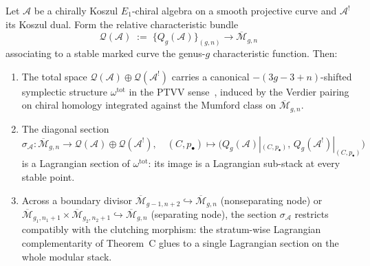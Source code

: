 \begin{theorem}
\label{thm:theoremC-total-shifted-symplectic}
Let $\mathcal{A}$ be a chirally Koszul $E_1$-chiral algebra on a
smooth projective curve and $\mathcal{A}^!$ its Koszul dual. Form
the relative characteristic bundle
\[
 \mathcal{Q}(\mathcal{A}) \;:=\;
 \bigl\{Q_g(\mathcal{A})\bigr\}_{(g,n)} \longrightarrow
 \overline{\mathcal{M}}_{g,n}
\]
associating to a stable marked curve the genus-$g$ characteristic
function. Then:
\begin{enumerate}
\item\label{tsc-i} The total space
 $\mathcal{Q}(\mathcal{A}) \oplus \mathcal{Q}(\mathcal{A}^!)$
 carries a canonical $-(3g{-}3{+}n)$-shifted symplectic structure
 $\omega^{\mathrm{tot}}$ in the PTVV
 sense~\cite{PTVV13}, induced by the Verdier pairing on chiral
 homology integrated against the Mumford class on
 $\overline{\mathcal{M}}_{g,n}$.
\item\label{tsc-ii} The diagonal section
 $\sigma_{\mathcal{A}}\colon
 \overline{\mathcal{M}}_{g,n} \longrightarrow
 \mathcal{Q}(\mathcal{A}) \oplus \mathcal{Q}(\mathcal{A}^!),
 \quad
 (C, p_\bullet) \mapsto
 \bigl(Q_g(\mathcal{A})|_{(C,p_\bullet)},\,
 Q_g(\mathcal{A}^!)|_{(C,p_\bullet)}\bigr)$
 is a Lagrangian section of $\omega^{\mathrm{tot}}$: its image is a
 Lagrangian sub-stack at every stable point.
\item\label{tsc-iii} Across a boundary divisor
 $\overline{\mathcal{M}}_{g-1,n+2} \hookrightarrow
 \overline{\mathcal{M}}_{g,n}$ (nonseparating node) or
 $\overline{\mathcal{M}}_{g_1,n_1+1} \times
 \overline{\mathcal{M}}_{g_2,n_2+1}
 \hookrightarrow \overline{\mathcal{M}}_{g,n}$ (separating node),
 the section $\sigma_{\mathcal{A}}$ restricts compatibly with the
 clutching morphism: the stratum-wise Lagrangian complementarity
 of Theorem~C glues to a single Lagrangian section on the whole
 modular stack.
\end{enumerate}
\end{theorem}

